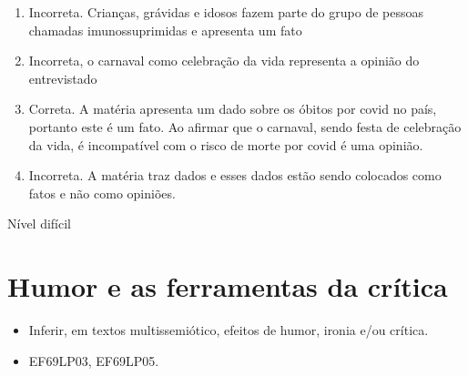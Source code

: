 {\begin{enumerate}
\def\labelenumi{\alph{enumi})}
\item
  Incorreta. Crianças, grávidas e idosos fazem parte do grupo de pessoas
  chamadas imunossuprimidas e apresenta um fato
\item
  Incorreta, o carnaval como celebração da vida representa a opinião do
  entrevistado
\item
  Correta. A matéria apresenta um dado sobre os óbitos por covid no
  país, portanto este é um fato. Ao afirmar que o carnaval, sendo festa
  de celebração da vida, é incompatível com o risco de morte por covid é
  uma opinião.
\item
  Incorreta. A matéria traz dados e esses dados estão sendo colocados
  como fatos e não como opiniões.
\end{enumerate}

Nível difícil


\chapter{Humor e as ferramentas da crítica}


\begin{itemize}

  \item Inferir, em textos multissemiótico, efeitos de humor, ironia e/ou
  crítica.

\end{itemize}


\begin{itemize}

  \item EF69LP03, EF69LP05.

\end{itemize}

}
